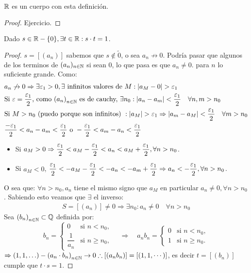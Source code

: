\begin{prop}
	\(\mathbb{R} \) es un cuerpo con esta definición.
	\begin{proof}
		Ejercicio.
	\end{proof}
\end{prop}

\clearpage

\begin{theorem}
	Dado \(s \in \mathbb{R} - \{0\}, \exists t \in \mathbb{R} : s \cdot t = 1\).
	\begin{proof}
		\(s = [(a_n)]\) sabemos que \(s \notin \tilde{0} \), o sea \(a_n \not \to 0\).
		Podría pasar que algunos de los terminos de \((a_n)_{n \in \mathbb{N}} \) si sean \(0 \), lo que pasa es que \(a_n \neq 0.\) para \(n\) lo suficiente grande.
		Como:
		\begin{align*}
			 & a_n \not \to 0 \Rightarrow \exists \varepsilon_1 > 0, \exists \text{ infinitos valores de } M: |a_M - 0| > \varepsilon_1                                                     \\
			 & \text{Si } \varepsilon = \dfrac{\varepsilon_1}{2}\text{, como } {(a_n)}_{n \in \mathbb{N}} \text{ es de cauchy, } \exists n_0 : |a_n - a_m| < \dfrac{\varepsilon_1}{2} \quad \forall n, m > n_0 \\
			 & \text{Si } M > n_0 \text{ (puedo porque son infinitos) } : |a_M| > \varepsilon_1 \Rightarrow |a_m - a_M| < \dfrac{\varepsilon_1}{2} \quad \forall m > n_0                    \\
			 & \dfrac{-\varepsilon_1}{2} < a_n - a_m < \dfrac{\varepsilon_1}{2} \text{ o } -\dfrac{\varepsilon_1}{2} < a_m - a_n < \dfrac{\varepsilon_1}{2}
		\end{align*}\begin{itemize}
			\item Si \(a_M > 0 \Rightarrow \dfrac{\varepsilon_1}{2} < a_M - \dfrac{\varepsilon_1}{2} < a_n < a_M + \dfrac{\varepsilon_1}{2}, \forall n > n_0\).
			\item Si \(a_M < 0\), \(\dfrac{\varepsilon_1}{2} < -a_M - \dfrac{\varepsilon_1}{2} < -a_n<-a_m+ \dfrac{\varepsilon_1}{2} \Rightarrow a_n < -\dfrac{\varepsilon_1}{2}, \forall n > n_0\).
		\end{itemize}
		O sea que: \(\forall n > n_0, a_n\) tiene el mismo signo que \(a_M\) en particular \(a_n \neq 0, \forall n > n_0\). Sabiendo esto veamos que \(\exists \) el inverso: \begin{align*}
			S = [(a_n)] \neq 0 \Rightarrow \exists n_0 : a_n \neq 0 \quad \forall n > n_0
		\end{align*}
		Sea \({(b_n)}_{n \in \mathbb{N}} \subset \mathbb{Q} \) definida por:
		\[
			b_n =
			\begin{cases}
				0              & \text{si } n < n_0,    \\
				\dfrac{1}{a_n} & \text{si } n \geq n_0,
			\end{cases}
			\quad \Rightarrow \quad
			a_n b_n =
			\begin{cases}
				0 & \text{si } n < n_0,    \\
				1 & \text{si } n \geq n_0.
			\end{cases}
		\]
		\( \Rightarrow (1, 1, \ldots) - {(a_n \cdot b_n)}_{n \in \mathbb{N}} \to 0 \therefore [(a_n b_n)] = [(1, 1, \cdots)]\), es decir \(t = [(b_n)]\) cumple que \(t \cdot s = 1\).
	\end{proof}
\end{theorem}


